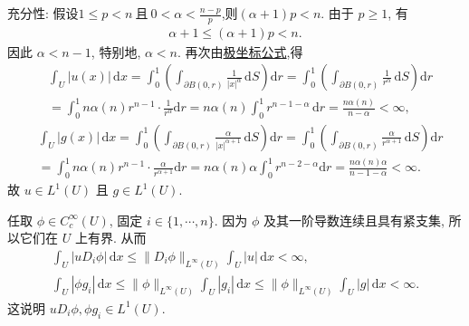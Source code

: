 \documentclass[../../main.tex]{subfiles}
\begin{document}
\begin{solution}
{\heiti 充分性:}
假设$1\leqslant p<n
\ \text{且}\
0<\alpha<\frac{n-p}{p}$,则$(\alpha+1)p<n$. 由于 $p\geqslant1$, 有
\begin{align*}
\alpha+1\leqslant(\alpha+1)p<n.
\end{align*}
因此 $\alpha<n-1$, 特别地, $\alpha<n$. 再次由\hyperref[theorem:appC-极坐标]{极坐标公式},得
\begin{align*}
&\int_U{|u(x)|\,\mathrm{d}x}=\int_0^1{\left( \int_{\partial B\left( 0,r \right)}{\frac{1}{\left| x \right|^{\alpha}}\,\mathrm{d}S} \right) \mathrm{d}r}=\int_0^1{\left( \int_{\partial B\left( 0,r \right)}{\frac{1}{r^{\alpha}}\,\mathrm{d}S} \right) \mathrm{d}r}
\\
&=\int_0^1{n\alpha \left( n \right) r^{n-1}\cdot \frac{1}{r^{\alpha}}\mathrm{d}r}=n\alpha (n)\int_0^1{r^{n-1-\alpha}\,\mathrm{d}r}=\frac{n\alpha \left( n \right)}{n-\alpha}<\infty ,
\end{align*}
\begin{align*}
&\int_U{\left| g\left( x \right) \right|\,\mathrm{d}x}=\int_0^1{\left( \int_{\partial B\left( 0,r \right)}{\frac{\alpha}{\left| x \right|^{\alpha +1}}\,\mathrm{d}S} \right) \mathrm{d}r}=\int_0^1{\left( \int_{\partial B\left( 0,r \right)}{\frac{\alpha}{r^{\alpha +1}}\,\mathrm{d}S} \right) \mathrm{d}r}
\\
&=\int_0^1{n\alpha \left( n \right) r^{n-1}\cdot \frac{\alpha}{r^{\alpha +1}}\mathrm{d}r}=n\alpha \left( n \right) \alpha \int_0^1{r^{n-2-\alpha}\mathrm{d}r}=\frac{n\alpha \left( n \right) \alpha}{n-1-\alpha}<\infty .
\end{align*}
故 $u\in L^1(U)$ 且 $g\in L^1(U)$.

任取 $\phi\in C_c^\infty(U)$, 固定 $i\in\{1,\cdots,n\}$. 因为 $\phi$ 及其一阶导数连续且具有紧支集, 所以它们在 $U$ 上有界. 从而
\begin{gather*}
\int_U|uD_i\phi|\,\mathrm{d}x
\leqslant
\|D_i\phi\|_{L^\infty(U)}
\int_U|u|\,\mathrm{d}x<\infty,\\
\int_U|\phi g_i|\,\mathrm{d}x
\leqslant
\|\phi\|_{L^\infty(U)}
\int_U|g_i|\,\mathrm{d}x\leqslant
\|\phi\|_{L^\infty(U)}
\int_U|g|\,\mathrm{d}x<\infty.
\end{gather*}
这说明 $uD_i\phi,\phi g_i\in L^1(U)$.


\end{solution}
\end{document}
